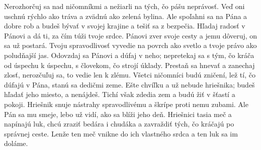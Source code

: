 Nerozhorčuj sa nad ničomníkmi
a nežiarli na tých, čo pášu neprávosť.
\versseparator
Veď oni uschnú rýchlo ako tráva
a zvädnú ako zelená bylina.
\versseparator
Ale spoľahni sa na Pána a dobre rob
a budeš bývať v svojej krajine a tešiť sa z bezpečia.
\versseparator
Hľadaj radosť v Pánovi
a dá ti, za čím túži tvoje srdce.
\versseparator
Pánovi zver svoje cesty a jemu dôveruj,
on sa už postará.
\versseparator
Tvoju spravodlivosť vyvedie na povrch ako svetlo
a tvoje právo ako poludňajší jas.
\versseparator
Odovzdaj sa Pánovi a dúfaj v neho;
nepretekaj sa s tým, čo kráča od úspechu k úspechu,
s človekom, čo strojí úklady.
\versseparator
Prestaň sa hnevať a zanechaj zlosť,
nerozčuľuj sa, to vedie len k zlému.
\versseparator
Všetci ničomníci budú zničení,
lež tí, čo dúfajú v Pána, stanú sa dedičmi zeme.
\versseparator
Ešte chvíľku a už nebude hriešnika;
budeš hľadať jeho miesto, a nenájdeš.
\versseparator
Tichí však zdedia zem
a budú žiť v šťastí a pokoji.
\versseparator
Hriešnik snuje nástrahy spravodlivému
a škrípe proti nemu zubami.
\versseparator
Ale Pán sa mu smeje,
lebo už vidí, ako sa blíži jeho deň.
\versseparator
Hriešnici tasia meč
a napínajú luk,
\versseparator
chcú zraziť bedára i chudáka
a zavraždiť tých, čo kráčajú po správnej ceste.
\versseparator
Lenže ten meč vnikne do ich vlastného srdca
a ten luk sa im doláme.
